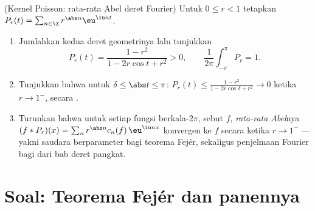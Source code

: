 \begin{exercise}[$\star\star\star$]\label{exo:b2:fourier:12}
(Kernel Poisson: rata-rata Abel deret Fourier) Untuk $0 \leq r <
1$ tetapkan $P_r(t) = \sum_{n\in\Z} r^{\abs n}\eu^{\iu nt}$.
\begin{enumerate}
  \item Jumlahkan kedua deret geometrinya lalu tunjukkan
        \[
        P_r(t) = \frac{1 - r^2}{1 - 2r\cos t + r^2} > 0,
        \qquad
        \frac{1}{2\pi}\int_{-\pi}^{\pi}P_r = 1 .
        \]
  \item Tunjukkan bahwa untuk $\delta \leq \abs t \leq \pi$: $P_r(t)
        \leq \frac{1 - r^2}{1 - 2r\cos\delta + r^2} \to 0$ ketika
        $r \to 1^-$, secara .
  \item Turunkan bahwa untuk setiap fungsi  berkala-$2\pi$, sebut $f$,
        \emph{rata-rata Abel}nya $(f * P_r)(x) = \sum_n
        r^{\abs n}c_n(f)\,\eu^{\iu nx}$ konvergen ke $f$
        secara  ketika $r \to 1^-$ --- yakni saudara
        berparameter  bagi teorema Fejér, sekaligus penjelmaan
        Fourier bagi  dari bab deret
        pangkat.
\end{enumerate}
\end{exercise}

\section{Soal: Teorema Fejér dan panennya}

